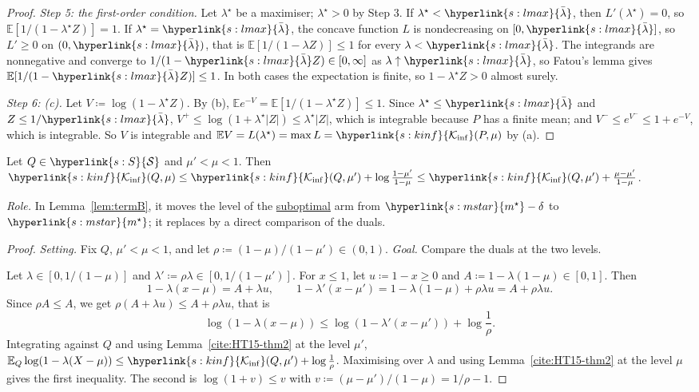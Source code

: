 \documentclass[11pt]{article}
\newcommand{\E}{\mathbb{E}}
\newcommand{\sy}[2]{{\hyperlink{#1}{#2}}}
\newcommand{\term}[2]{\hyperlink{#1}{#2}}
\newcommand{\Sm}{\sy{s:S}{\mathcal{S}}}
\newcommand{\ms}{\sy{s:mstar}{m^{\star}}}
\newcommand{\Kinf}{\sy{s:kinf}{\mathcal{K}_{\inf}}}
\newcommand{\lmax}{\sy{s:lmax}{\bar{\lambda}}}
\begin{document}
\begin{proof}
\emph{Step 5: the first-order condition.} Let $\lambda^\star$ be a maximiser; $\lambda^\star>0$ by
Step 3. If $\lambda^\star<\lmax$, then $L'(\lambda^\star)=0$, so $\E[1/(1-\lambda^\star Z)]=1$. If
$\lambda^\star=\lmax$, the concave function $L$ is nondecreasing on $[0,\lmax]$, so $L'\ge0$ on
$(0,\lmax)$, that is $\E[1/(1-\lambda Z)]\le1$ for every $\lambda<\lmax$. The integrands are
nonnegative and converge to $1/(1-\lmax Z)\in[0,\infty]$ as $\lambda\uparrow\lmax$, so Fatou's lemma
gives $\E[1/(1-\lmax Z)]\le1$. In both cases the expectation is finite, so $1-\lambda^\star Z>0$
almost surely.

\emph{Step 6: (c).} Let $V\coloneqq\log(1-\lambda^\star Z)$. By (b), $\E e^{-V}=\E[1/(1-\lambda^\star Z)]\le1$.
Since $\lambda^\star\le\lmax$ and $Z\le1/\lmax$, $V^+\le\log(1+\lambda^\star|Z|)\le\lambda^\star|Z|$, which is
integrable because $P$ has a finite mean; and $V^-\le e^{V^-}\le1+e^{-V}$, which is integrable. So
$V$ is integrable and $\E V=L(\lambda^\star)=\max L=\Kinf(P,\mu)$ by (a).
\end{proof}

\begin{lemma}\label{lem:shift}
Let $Q\in\Sm$ and $\mu'<\mu<1$. Then
$\Kinf(Q,\mu)\le\Kinf(Q,\mu')+\log\frac{1-\mu'}{1-\mu}\le\Kinf(Q,\mu')+\frac{\mu-\mu'}{1-\mu}$.
\end{lemma}

\emph{Role.} In Lemma~\ref{lem:termB}, it moves the level of the \term{w:subopt}{suboptimal} arm from
$\ms-\delta$ to $\ms$; it replaces \citet[Lemma~7]{HT15} by a direct comparison of the duals.

\begin{proof}
\emph{Setting.} Fix $Q$, $\mu'<\mu<1$, and let $\rho\coloneqq(1-\mu)/(1-\mu')\in(0,1)$.
\emph{Goal.} Compare the duals at the two levels.

Let $\lambda\in[0,1/(1-\mu)]$ and $\lambda'\coloneqq\rho\lambda\in[0,1/(1-\mu')]$. For $x\le1$, let
$u\coloneqq1-x\ge0$ and $A\coloneqq1-\lambda(1-\mu)\in[0,1]$. Then
\[
  1-\lambda(x-\mu)=A+\lambda u,\qquad1-\lambda'(x-\mu')=1-\lambda(1-\mu)+\rho\lambda u=A+\rho\lambda u.
\]
Since $\rho A\le A$, we get $\rho(A+\lambda u)\le A+\rho\lambda u$, that is
\[
  \log(1-\lambda(x-\mu))\le\log(1-\lambda'(x-\mu'))+\log\frac1\rho.
\]
Integrating against $Q$ and using Lemma~\ref{cite:HT15-thm2} at the level $\mu'$,
$\E_Q\log(1-\lambda(X-\mu))\le\Kinf(Q,\mu')+\log\frac1\rho$. Maximising over $\lambda$ and using
Lemma~\ref{cite:HT15-thm2} at the level $\mu$ gives the first inequality. The second is
$\log(1+v)\le v$ with $v\coloneqq(\mu-\mu')/(1-\mu)=1/\rho-1$.
\end{proof}
\end{document}
